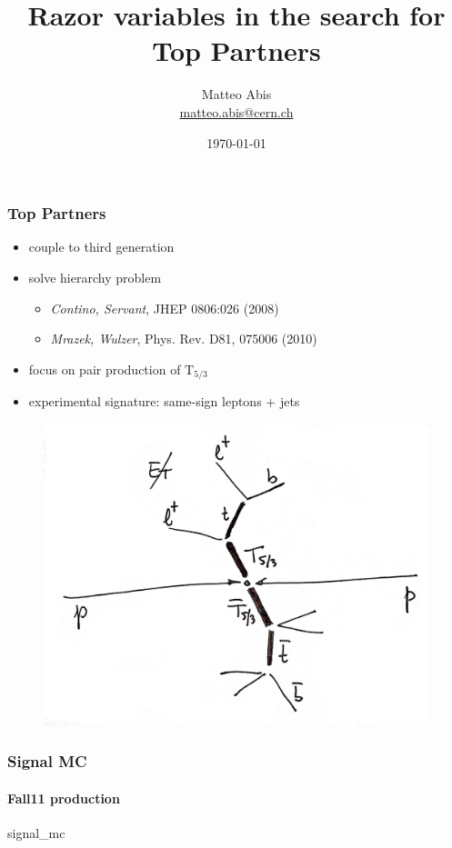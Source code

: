 \documentclass[ukenglish]{beamer}
\title[Razor for Top Partners]{Razor variables in the search for Top
Partners}
\author{Matteo Abis\\
\url{matteo.abis@cern.ch}}
\institute{Università di Padova and INFN}
\date{\today}
\begin{document}
\begin{frame}
  \titlepage
\end{frame}
 
\begin{frame}
    \frametitle{Top Partners}
    \begin{itemize}
        \item couple to third generation
        \item solve hierarchy problem
            \begin{itemize}
                \item \emph{Contino, Servant}, JHEP 0806:026 (2008)
                \item \emph{Mrazek, Wulzer}, Phys. Rev. D81, 075006 (2010)
            \end{itemize}
        \item focus on pair production of $\mathrm{T}_{5/3}$
        \item experimental signature: same-sign leptons + jets
    \end{itemize}
    \begin{figure}[h]
        \centering
        \includegraphics[height=.5\textheight]{toppartner_decay_top.eps}
    \end{figure}
\end{frame}

\begin{frame}
    \frametitle{Signal MC}
    \framesubtitle{Fall11 production}
    {signal_mc}
\end{frame}
\end{document}
